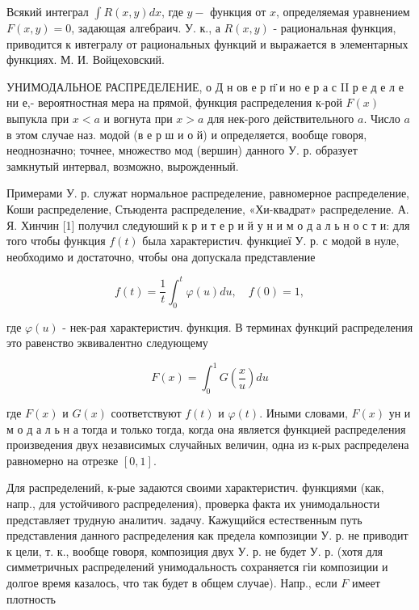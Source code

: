 \documentclass[10pt]{article}
\begin{document}
Всякий интеграл $\int R(x, y) d x$, где $y-$ функция от $x$, определяемая уравнением $F(x, y)=0$, задающая алгебраич. У. к., а $R(x, y)$ - рациональная функция, приводится к ивтегралу от рациональных функций и выражается в элементарных функциях. М. И. Войцеховский.



УНИМОДАЛЬНОЕ РАСПРЕДЕЛЕНИЕ, о Д н ов е р п̈ и но е р а с II р е д е л е ни е,- вероятностная мера на прямой, функция распределения к-рой $F(x)$ выпукла при $x<a$ и вогнута при $x>a$ для нек-рого действительного $a$. Число $a$ в этом случае наз. модой (в е р ш и о й) и определяется, вообще говоря, неоднозначно; точнее, множество мод (вершин) данного У. р. образует замкнутый интервал, возможно, вырожденный.



Примерами У. р. служат нормальное распределение, равномерное распределение, Коши распределение, Стьюдента распределение, «Хи-квадрат» распределение. А. Я. Хинчин [1] получил следуюший к р и т е р и й у н и м о д а л ь н о с т и: для того чтобы функция $f(t)$ была характеристич. функциеї У. р. с модой в нуле, необходимо и достаточно, чтобы она допускала представление



\[

f(t)=\frac{1}{t} \int_{0}^{t} \varphi(u) d u, \quad f(0)=1,

\]



где $\varphi(u)$ - нек-рая характеристич. функция. В терминах функций распределения это равенство эквивалентно следующему



\[

F(x)=\int_{0}^{1} G\left(\frac{x}{u}\right) d u

\]



где $F(x)$ и $G(x)$ соответствуют $f(t)$ и $\varphi(t)$. Иными словами, $F(x)$ ун и м о д а л ь н а тогда и только тогда, когда она является функцией распределения произведения двух независимых случайных величин, одна из к-рых распределена равномерно на отрезке $[0,1]$.



Для распределений, к-рые задаются своими характеристич. функциями (как, напр., для устойчивого распределения), проверка факта их унимодальности представляет трудную аналитич. задачу. Кажущийся естественным путь представления данного распределения как предела композиции У. р. не приводит к цели, т. к., вообще говоря, композиция двух У. р. не будет У. р. (хотя для симметричных распределений унимодальность сохраняется гіи композиции и долгое время казалось, что так будет в общем случае). Напр., если $F$ имеет плотность
\end{document}

